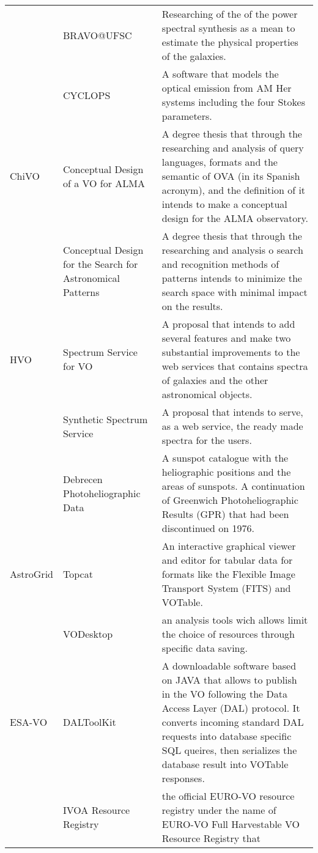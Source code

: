 \begin{table*}[h!t]
\begin{tabular}{|l|l|p{12.5cm}|}
			& BRAVO@UFSC & Researching of the of the power spectral synthesis as a mean to estimate the physical properties of the galaxies.\\
			& CYCLOPS & A software that models the optical emission from AM Her systems including the four Stokes parameters.\\
	\hline
	ChiVO	& Conceptual Design of a VO for ALMA & A degree thesis that through the researching and analysis of 
									query languages, formats and the semantic of OVA (in its Spanish acronym), and the definition of it intends to make a conceptual design for the ALMA 
									observatory.\\
			& Conceptual Design for the Search for Astronomical Patterns & A degree thesis that through 
									the researching and analysis o search and recognition methods of 
									patterns intends to minimize the search space with minimal impact on the 
									results. \\
	\hline								
	HVO		& Spectrum Service for VO & A proposal that intends to add several features and make two substantial improvements to the web services that 
									contains spectra of galaxies and the other astronomical objects.\\
			& Synthetic Spectrum Service & A proposal that intends to serve, as a web service, the ready made spectra for the users.\\
			& Debrecen Photoheliographic Data & A sunspot catalogue with the heliographic positions and the areas of sunspots. A continuation of Greenwich 
									Photoheliographic Results (GPR) that had been discontinued on 1976.\\
	\hline								
	AstroGrid& Topcat & An interactive graphical viewer and editor for tabular data for formats like the Flexible Image Transport System (FITS) 
									and VOTable. \\
			& VODesktop & an analysis tools wich allows limit the choice of resources through specific data saving.\\
	\hline		
	ESA-VO	& DALToolKit & A downloadable software based on JAVA that allows to publish in the VO following the Data Access Layer (DAL) protocol. It 
									converts incoming standard DAL requests into database specific SQL queires, then serializes the database result into VOTable 
									responses. \\
			& IVOA Resource Registry & the official EURO-VO resource registry under the name of EURO-VO Full Harvestable VO Resource Registry that \\

\end{tabular}
\end{table*}
